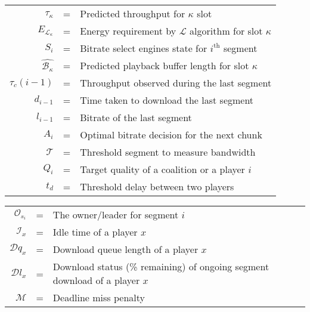 \begin{table}[h!]
\begin{tabular}{rcl}
	$\hat{\tau}_{{\kappa}}$ &=& Predicted throughput for $\kappa$ slot\\
	$E_{\mathrm{\mathcal{L}}_\kappa}$ &=& Energy requirement by $\mathcal{L}$ algorithm for slot $\kappa$ \\
	$S_{i}$ &=& Bitrate select engines state for $i^\text{th}$ segment \\
	$\hat{\mathcal{B}_\kappa}$ &=& Predicted playback buffer length for slot $\kappa$ \\
	$\tau_c(i-1)$ &=& Throughput observed during the last segment \\
	$d_{i-1}$ &=& Time taken to download the last segment \\
	$l_{i-1}$ &=& Bitrate of the last segment \\
	$A_i$ &=& Optimal bitrate decision for the next chunk \\
	$\mathcal{T}$ &=& Threshold segment to measure bandwidth \\
	$Q_i$ &=& Target quality of a coalition or a player $i$ \\
	$t_d$ &=& Threshold delay between two players \\
\end{tabular}
\end{table}

\makeatletter
\setlength{\@fptop}{0pt}
\makeatother

\begin{table}[ht!]
\begin{tabular}{rcl}
	$\mathcal{O}_{s_{i}}$ &=& The owner/leader for segment $i$ \\
	$\mathcal{I}_x$ &=& Idle time of a player $x$ \\
	$\mathcal{D}{q_x}$ &=& Download queue length of a player $x$ \\
	$\mathcal{D}{l_x}$ &=& Download status (\% remaining) of ongoing segment download of a player $x$\\
	$\mathcal{M}$ &=& Deadline miss penalty \\
\end{tabular}
\end{table}
\vfill
